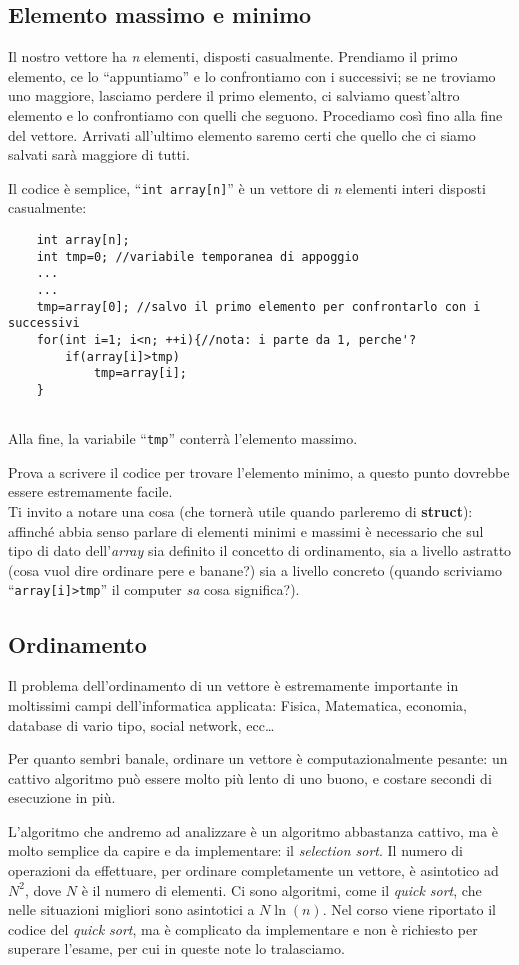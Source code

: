 \subsection{Elemento massimo e minimo}
Il nostro vettore ha \emph{n} elementi, disposti casualmente. Prendiamo il primo elemento, ce lo ``appuntiamo'' e lo confrontiamo con i successivi; se ne troviamo uno maggiore, lasciamo perdere il primo elemento, ci salviamo quest'altro elemento e lo confrontiamo con quelli che seguono. Procediamo così fino alla fine del vettore. Arrivati all'ultimo elemento saremo certi che quello che ci siamo salvati sarà maggiore di tutti. 

Il codice è semplice,  ``\lstinline|int array[n]|'' è un vettore di \emph{n} elementi interi disposti casualmente:
\begin{lstlisting}
	int array[n];
	int tmp=0; //variabile temporanea di appoggio
	...
	...
	tmp=array[0]; //salvo il primo elemento per confrontarlo con i successivi
	for(int i=1; i<n; ++i){//nota: i parte da 1, perche'?
		if(array[i]>tmp)
			tmp=array[i];	
	}
	
\end{lstlisting}
Alla fine, la variabile ``\verb|tmp|'' conterrà l'elemento massimo.

Prova a scrivere il codice per trovare l'elemento minimo, a questo punto dovrebbe essere estremamente facile.\\

Ti invito a notare una cosa (che tornerà utile quando parleremo di \textbf{struct}): affinché abbia senso parlare di elementi minimi e massimi è necessario che sul tipo di dato dell'\emph{array} sia definito il concetto di ordinamento, sia a livello astratto (cosa vuol dire ordinare pere e banane?) sia a livello concreto (quando scriviamo ``\lstinline|array[i]>tmp|'' il computer \emph{sa} cosa significa?). 
\subsection{Ordinamento}
Il problema dell'ordinamento di un vettore è estremamente importante in moltissimi campi dell'informatica applicata: Fisica, Matematica, economia, database di vario tipo, social network, ecc\ldots 

Per quanto sembri banale, ordinare un vettore è computazionalmente pesante: un cattivo algoritmo può essere molto più lento di uno buono, e costare secondi di esecuzione in più. 

L'algoritmo che andremo ad analizzare è un algoritmo abbastanza cattivo, ma è molto semplice da capire e da implementare: il \emph{selection sort}. Il numero di operazioni da effettuare, per ordinare completamente un vettore, è asintotico ad $N^2$, dove $N$ è il numero di elementi. Ci sono algoritmi, come il \emph{quick sort}, che nelle situazioni migliori sono asintotici a $N \ln(n)$. Nel corso viene riportato il codice del \emph{quick sort}, ma è complicato da implementare e non è richiesto per superare l'esame, per cui in queste note lo tralasciamo.

